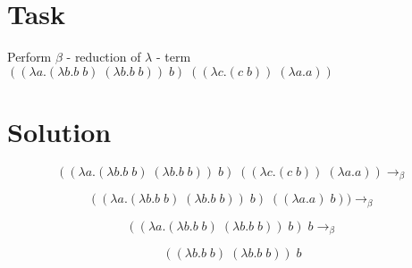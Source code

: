\documentclass[12pt]{report}
\begin{document}
\section*{Task}

Perform $\beta$ - reduction of $\lambda$ - term $((\lambda a.(\lambda b.b\; b)\; (\lambda b.b\; b))\; b)\; ((\lambda c.(c\; b))\; (\lambda a.a))$ \newline

\section*{Solution}

$$((\lambda a.(\lambda b.b\; b)\; (\lambda b.b\; b))\; b)\; ((\lambda c.(c\; b))\; (\lambda a.a)) \rightarrow_\beta$$

$$((\lambda a.(\lambda b.b\; b)\; (\lambda b.b\; b))\; b)\; ((\lambda a.a)\; b)) \rightarrow_\beta$$

$$((\lambda a.(\lambda b.b\; b)\; (\lambda b.b\; b))\; b)\; b \rightarrow_\beta$$

$$((\lambda b.b\; b)\; (\lambda b.b\; b))\; b$$
\end{document}
